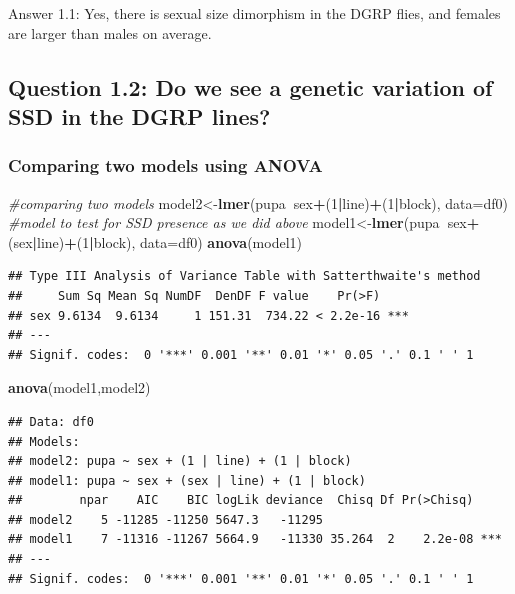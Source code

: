\documentclass[
]{article}
\newenvironment{Shaded}{\begin{snugshade}}{\end{snugshade}}
\newcommand{\CommentTok}[1]{\textcolor[rgb]{0.56,0.35,0.01}{\textit{#1}}}
\newcommand{\DataTypeTok}[1]{\textcolor[rgb]{0.13,0.29,0.53}{#1}}
\newcommand{\DecValTok}[1]{\textcolor[rgb]{0.00,0.00,0.81}{#1}}
\newcommand{\KeywordTok}[1]{\textcolor[rgb]{0.13,0.29,0.53}{\textbf{#1}}}
\newcommand{\NormalTok}[1]{#1}
\newcommand{\OperatorTok}[1]{\textcolor[rgb]{0.81,0.36,0.00}{\textbf{#1}}}
\begin{document}
Answer 1.1: Yes, there is sexual size dimorphism in the DGRP flies, and
females are larger than males on average.

\hypertarget{question-1.2-do-we-see-a-genetic-variation-of-ssd-in-the-dgrp-lines}{%
\subsection{Question 1.2: Do we see a genetic variation of SSD in the
DGRP
lines?}\label{question-1.2-do-we-see-a-genetic-variation-of-ssd-in-the-dgrp-lines}}

\hypertarget{comparing-two-models-using-anova}{%
\subsubsection{Comparing two models using
ANOVA}\label{comparing-two-models-using-anova}}

\begin{Shaded}
\begin{Highlighting}[]
\CommentTok{#comparing two models}
\NormalTok{model2<-}\KeywordTok{lmer}\NormalTok{(pupa}\OperatorTok{~}\NormalTok{sex}\OperatorTok{+}\NormalTok{(}\DecValTok{1}\OperatorTok{|}\NormalTok{line)}\OperatorTok{+}\NormalTok{(}\DecValTok{1}\OperatorTok{|}\NormalTok{block), }\DataTypeTok{data=}\NormalTok{df0)  }\CommentTok{#model to test for SSD presence as we did above}
\NormalTok{model1<-}\KeywordTok{lmer}\NormalTok{(pupa}\OperatorTok{~}\NormalTok{sex}\OperatorTok{+}\NormalTok{(sex}\OperatorTok{|}\NormalTok{line)}\OperatorTok{+}\NormalTok{(}\DecValTok{1}\OperatorTok{|}\NormalTok{block), }\DataTypeTok{data=}\NormalTok{df0) }
\KeywordTok{anova}\NormalTok{(model1)}
\end{Highlighting}
\end{Shaded}

\begin{verbatim}
## Type III Analysis of Variance Table with Satterthwaite's method
##     Sum Sq Mean Sq NumDF  DenDF F value    Pr(>F)    
## sex 9.6134  9.6134     1 151.31  734.22 < 2.2e-16 ***
## ---
## Signif. codes:  0 '***' 0.001 '**' 0.01 '*' 0.05 '.' 0.1 ' ' 1
\end{verbatim}

\begin{Shaded}
\begin{Highlighting}[]
\KeywordTok{anova}\NormalTok{(model1,model2)}
\end{Highlighting}
\end{Shaded}

\begin{verbatim}
## Data: df0
## Models:
## model2: pupa ~ sex + (1 | line) + (1 | block)
## model1: pupa ~ sex + (sex | line) + (1 | block)
##        npar    AIC    BIC logLik deviance  Chisq Df Pr(>Chisq)    
## model2    5 -11285 -11250 5647.3   -11295                         
## model1    7 -11316 -11267 5664.9   -11330 35.264  2    2.2e-08 ***
## ---
## Signif. codes:  0 '***' 0.001 '**' 0.01 '*' 0.05 '.' 0.1 ' ' 1
\end{verbatim}
\end{document}
